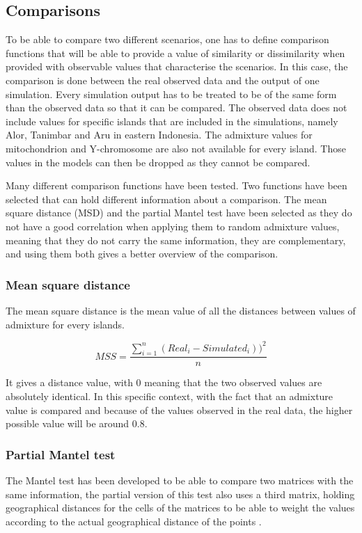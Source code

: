 \documentclass[a4paper,11pt]{report}
\begin{document}
\subsection{Comparisons}
To be able to compare two different scenarios, one has to define comparison functions that will be able to provide a value of similarity or dissimilarity when provided with observable values that characterise the scenarios. In this case, the comparison is done between the real observed data and the output of one simulation.
Every simulation output has to be treated to be of the same form than the observed data so that it can be compared. The observed data does not include values for specific islands that are included in the simulations, namely Alor, Tanimbar and Aru in eastern Indonesia. The admixture values for mitochondrion and Y-chromosome are also not available for every island.
Those values in the models can then be dropped as they cannot be compared.

Many different comparison functions have been tested. Two functions have been selected that can hold different information about a comparison. The mean square distance (MSD) and the partial Mantel test have been selected as they do not have a good correlation when applying them to random admixture values, meaning that they do not carry the same information, they are complementary, and using them both gives a better overview of the comparison.

\subsubsection{Mean square distance}
The mean square distance is the mean value of all the distances between values of admixture for every islands.

\begin{equation}
MSS = \frac{\sum\limits_{i=1}^{n} (Real_i - Simulated_i)) ^ 2}{n}
\end{equation}

It gives a distance value, with 0 meaning that the two observed values are absolutely identical. In this specific context, with the fact that an admixture value is compared and because of the values observed in the real data, the higher possible value will be around $0.8$.


\subsubsection{Partial Mantel test}
The Mantel test has been developed to be able to compare two matrices with the same information, the partial version of this test also uses a third matrix, holding geographical distances for the cells of the matrices to be able to weight the values according to the actual geographical distance of the points \cite{Smo01}.
\end{document}

